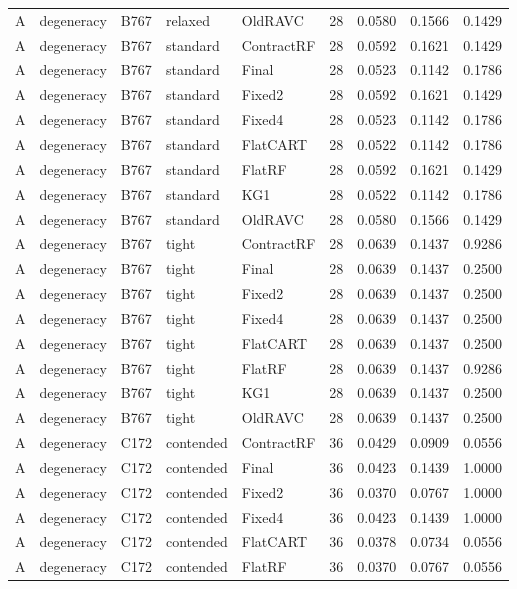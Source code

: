 \begin{longtable}{@{}lllllllll@{}}
A & degeneracy & B767 & relaxed & OldRAVC & 28 & 0.0580 & 0.1566 & 0.1429\\
A & degeneracy & B767 & standard & ContractRF & 28 & 0.0592 & 0.1621 & 0.1429\\
A & degeneracy & B767 & standard & Final & 28 & 0.0523 & 0.1142 & 0.1786\\
A & degeneracy & B767 & standard & Fixed2 & 28 & 0.0592 & 0.1621 & 0.1429\\
A & degeneracy & B767 & standard & Fixed4 & 28 & 0.0523 & 0.1142 & 0.1786\\
A & degeneracy & B767 & standard & FlatCART & 28 & 0.0522 & 0.1142 & 0.1786\\
A & degeneracy & B767 & standard & FlatRF & 28 & 0.0592 & 0.1621 & 0.1429\\
A & degeneracy & B767 & standard & KG1 & 28 & 0.0522 & 0.1142 & 0.1786\\
A & degeneracy & B767 & standard & OldRAVC & 28 & 0.0580 & 0.1566 & 0.1429\\
A & degeneracy & B767 & tight & ContractRF & 28 & 0.0639 & 0.1437 & 0.9286\\
A & degeneracy & B767 & tight & Final & 28 & 0.0639 & 0.1437 & 0.2500\\
A & degeneracy & B767 & tight & Fixed2 & 28 & 0.0639 & 0.1437 & 0.2500\\
A & degeneracy & B767 & tight & Fixed4 & 28 & 0.0639 & 0.1437 & 0.2500\\
A & degeneracy & B767 & tight & FlatCART & 28 & 0.0639 & 0.1437 & 0.2500\\
A & degeneracy & B767 & tight & FlatRF & 28 & 0.0639 & 0.1437 & 0.9286\\
A & degeneracy & B767 & tight & KG1 & 28 & 0.0639 & 0.1437 & 0.2500\\
A & degeneracy & B767 & tight & OldRAVC & 28 & 0.0639 & 0.1437 & 0.2500\\
A & degeneracy & C172 & contended & ContractRF & 36 & 0.0429 & 0.0909 & 0.0556\\
A & degeneracy & C172 & contended & Final & 36 & 0.0423 & 0.1439 & 1.0000\\
A & degeneracy & C172 & contended & Fixed2 & 36 & 0.0370 & 0.0767 & 1.0000\\
A & degeneracy & C172 & contended & Fixed4 & 36 & 0.0423 & 0.1439 & 1.0000\\
A & degeneracy & C172 & contended & FlatCART & 36 & 0.0378 & 0.0734 & 0.0556\\
A & degeneracy & C172 & contended & FlatRF & 36 & 0.0370 & 0.0767 & 0.0556\\

\end{longtable}
